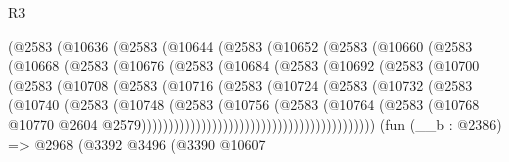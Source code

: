 \begin{lexlean}{R3}
\begin{coremodule}
                  (@2583
                    (@10636
                      (@2583
                        (@10644
                          (@2583
                            (@10652
                              (@2583
                                (@10660
                                  (@2583
                                    (@10668
                                      (@2583
                                        (@10676
                                          (@2583
                                            (@10684
                                              (@2583
                                                (@10692
                                                  (@2583
                                                    (@10700
                                                      (@2583
                                                        (@10708
                                                          (@2583
                                                            (@10716
                                                              (@2583
                                                                (@10724
                                                                  (@2583
                                                                    (@10732
                                                                      (@2583
                                                                        (@10740
                                                                          (@2583
                                                                            (@10748
                                                                              (@2583
                                                                                (@10756
                                                                                  (@2583
                                                                                    (@10764
                                                                                      (@2583
                                                                                        (@10768
                                                                                          @10770
                                                                                          @2604
                                                                                          @2579)))))))))))))))))))))))))))))))))))))))))))
    (fun (__b : @2386) =>
    @2968
      (@3392
        @3496
        (@3390
          @10607

\end{coremodule}
\end{lexlean}
